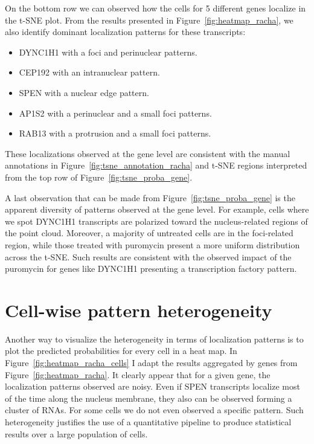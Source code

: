 On the bottom row we can observed how the cells for 5 different genes localize in the \ac{t-SNE} plot.
From the results presented in Figure~\ref{fig:heatmap_racha}, we also identify dominant localization patterns for these transcripts:
\begin{itemize}
	\setlength\itemsep{0.1em}
	\item DYNC1H1 with a foci and perinuclear patterns.
	\item CEP192 with an intranuclear pattern.
	\item SPEN with a nuclear edge pattern.
	\item AP1S2 with a perinuclear and a small foci patterns.
	\item RAB13 with a protrusion and a small foci patterns.
\end{itemize}

\noindent
These localizations observed at the gene level are consistent with the manual annotations in Figure~\ref{fig:tsne_annotation_racha} and \ac{t-SNE} regions interpreted from the top row of Figure~\ref{fig:tsne_proba_gene}.

A last observation that can be made from Figure~\ref{fig:tsne_proba_gene} is the apparent diversity of patterns observed at the gene level.
For example, cells where we spot DYNC1H1 transcripts are polarized toward the nucleus-related regions of the point cloud.
Moreover, a majority of untreated cells are in the foci-related region, while those treated with puromycin present a more uniform distribution across the \ac{t-SNE}.
Such results are consistent with the observed impact of the puromycin for genes like DYNC1H1 presenting a transcription factory pattern.

\section{Cell-wise pattern heterogeneity}
\label{sec:pattern_heterogeneity}

Another way to visualize the heterogeneity in terms of localization patterns is to plot the predicted probabilities for every cell in a heat map.
In Figure~\ref{fig:heatmap_racha_cells} I adapt the results aggregated by genes from Figure~\ref{fig:heatmap_racha}.
It clearly appear that for a given gene, the localization patterns observed are noisy.
Even if SPEN transcripts localize most of the time along the nucleus membrane, they also can be observed forming a cluster of \ac{RNA}s.
For some cells we do not even observed a specific pattern.
Such heterogeneity justifies the use of a quantitative pipeline to produce statistical results over a large population of cells.

